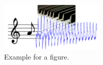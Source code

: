 \documentclass[a4paper, 9pt, twocolumn]{extarticle}
\begin{document}
\begin{figure}[t]
    \centering
    \includegraphics[width=5cm]{figure_example.png}
    \caption{Example for a figure.}
    \label{figure:example}
\end{figure}






\small

\end{document}
